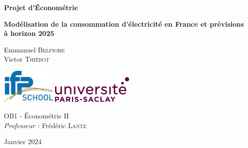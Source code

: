 \begin{titlepage}
   \begin{center}
      \vspace*{2cm}

      \textbf{\huge{Projet d'\'Econométrie}}

      \vspace{1cm}
      \textbf{\large{Modélisation de la consommation d'électricité en France et prévisions à horizon 2025}} \\
      \vspace{2 cm}
      \vspace{1.5cm}

      \large{
      Emmanuel \textsc{Belfiore}\\
      Victor \textsc{Thiébot}\\
      }
      \vfill

      \includegraphics[width = 0.2\textwidth]{images/IFP_Logo.png}
      \hspace{1cm}
      \includegraphics[width = 0.3\textwidth]{images/logo-paris-saclay.png}


      \vspace*{2cm}
      
      \large{OB1 - \'Econométrie II}\\
      \large{ \textit{Professeur :} Frédéric \textsc{Lantz}}\\


      \vspace{1cm}


      \large{Janvier 2024}

   \end{center}
\end{titlepage}